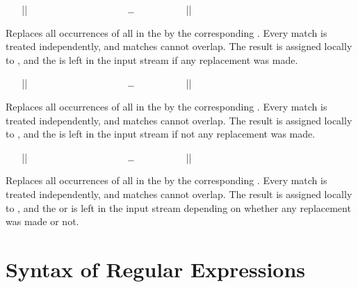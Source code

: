 \documentclass[oneside]{book}
\begin{document}
\begin{function}{\regexReplaceCaseAllT}
\begin{syntax}
~ ~ |{|
~ ~ ~ ~  
~ ~ ~ ~  
~ ~ ~ ~ \ldots
~ ~ ~ ~  
~ ~ |}| 
~ ~ 
\end{syntax}
Replaces all occurrences of all  in the 
by the corresponding .  Every match is
treated independently, and matches cannot overlap. The result is
assigned locally to , and the 
is left in the input stream if any replacement was made.
\end{function}

\begin{function}{\regexReplaceCaseAllF}
\begin{syntax}
~ ~ |{|
~ ~ ~ ~  
~ ~ ~ ~  
~ ~ ~ ~ \ldots
~ ~ ~ ~  
~ ~ |}| 
~ ~ 
\end{syntax}
Replaces all occurrences of all  in the 
by the corresponding .  Every match is
treated independently, and matches cannot overlap. The result is
assigned locally to , and the  is left
in the input stream if not any replacement was made.
\end{function}

\begin{function}{\regexReplaceCaseAllTF}
\begin{syntax}
~ ~ |{|
~ ~ ~ ~  
~ ~ ~ ~  
~ ~ ~ ~ \ldots
~ ~ ~ ~  
~ ~ |}| 
~ ~  
\end{syntax}
Replaces all occurrences of all  in the  by the corresponding .  Every match is
treated independently, and matches cannot overlap.  The result is
assigned locally to , and the  or
 is left in the input stream depending on whether
any replacement was made or not.
\end{function}

\section{Syntax of Regular Expressions}
\end{document}
